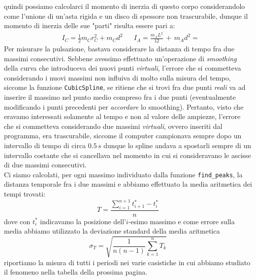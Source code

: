 \documentclass{article}
\begin{document}
\noindent quindi possiamo calcolarci il momento di inerzia di questo corpo considerandolo come l'unione di un'asta rigida e un disco di spessore non trascurabile, dunque il momento di inerzia delle sue "parti" risulta essere pari a:
\begin{align*}
	&I_C = \frac{1}{2} m_C r^2_C + m_C d^2 & &I_A = \frac{m_A L^2}{12} \, + \, m_A d^2 = 
\end{align*}
Per misurare la pulsazione, bastava considerare la distanza di tempo fra due massimi consecutivi. Sebbene avessimo effettuato un'operazione di \emph{smoothing} della curva che introduceva dei nuovi punti \emph{virtuali}, l'errore che si commetteva considerando i nuovi massimi non influiva di molto sulla misura del tempo, siccome la funzione \texttt{CubicSpline}, se ritiene che si trovi fra due punti \emph{reali} va ad inserire il massimo nel punto medio compreso fra i due punti (eventualmente modificando i punti precedenti per \emph{accordare} lo smoothing). Pertanto, visto che eravamo interessati solamente al tempo e non al valore delle ampiezze, l'errore che si commetteva considerando due massimi \emph{virtuali}, ovvero inseriti dal programma, era trascurabile, siccome il computer campionava sempre dopo un intervallo di tempo di circa $0.5 \, s$ dunque lo spline andava a spostarli sempre di un intervallo costante che si cancellava nel momento in cui si consideravano le ascisse di due massimi consecutivi. \\
Ci siamo calcolati, per ogni massimo individuato dalla funzione \texttt{find\_peaks}, la distanza temporale fra i due massimi e abbiamo effettuato la media aritmetica dei tempi trovati:
\begin{equation}
	T = \frac{\sum\limits_{i=1}^{n+1} t^{*}_{i+1} - t^{*}_i}{n}
\end{equation}
dove con $t^{*}_{i}$ indicavamo la posizione dell'$i$-esimo massimo e come errore sulla media abbiamo utilizzato la deviazione standard della media aritmetica
\begin{equation}
	\sigma_{T} = \sqrt{\frac{1}{n(n-1)}\sum_{k=1}^{n}{T_k}}
\end{equation}
riportiamo la misura di tutti i periodi nei varie casistiche in cui abbiamo studiato il fenomeno nella tabella della prossima pagina.
\end{document}
